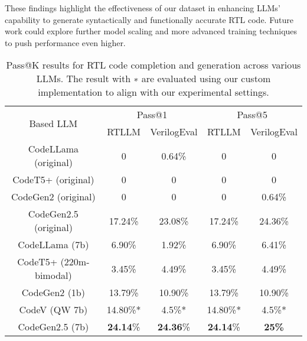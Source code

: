 These findings highlight the effectiveness of our dataset in enhancing LLMs’ capability to generate syntactically and functionally accurate RTL code. Future work could explore further model scaling and more advanced training techniques to push performance even higher.




\begin{table}[htbp]
\centering
\caption{Pass@K results for RTL code completion and generation across various LLMs. The result with ∗ are evaluated using our custom implementation to align with our experimental settings.}
\vspace{1em}
\setlength\tabcolsep{1.0pt}
\begin{tabular}{c|cc|cc}
\toprule
\multirow{2}{*}{Based LLM} & \multicolumn{2}{c|}{Pass@1}   & \multicolumn{2}{c}{Pass@5} \\
                           & RTLLM\cite{lu2024rtllm}       & VerilogEval\cite{liu2023verilogeval}    & RTLLM       & VerilogEval    \\ \midrule
CodeLLama (original)              & 0           & 0.64\%        & 0           & 0 \\
CodeT5+ (original)   & 0          & 0             & 0          & 0 \\
CodeGen2 (original)               & 0           & 0             & 0           & 0.64\%  \\
CodeGen2.5 (original)             & 17.24\%     & 23.08\%       & 17.24\%           & 24.36\% \\
\midrule
CodeLLama (7b)                    & 6.90\%      & 1.92\%        & 6.90\%      & 6.41\% \\
CodeT5+ (220m-bimodal)            & 3.45\%      & 4.49\%        & 3.45\%      & 4.49\% \\
CodeGen2 (1b)                     & 13.79\%     & 10.90\%             & 13.79\%          & 10.90\%     \\
CodeV (QW 7b) \cite{zhao2024codev}                   & 14.80\%*      & 4.5\%*      & 14.80\%*      & 4.5\%* \\
CodeGen2.5 (7b)                   & \textbf{24.14}\%     & \textbf{24.36}\%       & \textbf{24.14}\%           & \textbf{25\%}\\
\bottomrule
\end{tabular}

\label{tab:exper_gen_com}
\end{table}

